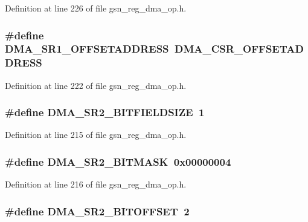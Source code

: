 Definition at line 226 of file gsn\_\-reg\_\-dma\_\-op.h.

\hypertarget{a00547_ada0e235423bd4db7ed48117ea4e5351a}{
\subsubsection[{DMA\_\-SR1\_\-OFFSETADDRESS}]{\setlength{\rightskip}{0pt plus 5cm}\#define DMA\_\-SR1\_\-OFFSETADDRESS~DMA\_\-CSR\_\-OFFSETADDRESS}}
\label{a00547_ada0e235423bd4db7ed48117ea4e5351a}


Definition at line 222 of file gsn\_\-reg\_\-dma\_\-op.h.

\hypertarget{a00547_ad366e18f388c97c7fa1c05106ed5b94f}{
\subsubsection[{DMA\_\-SR2\_\-BITFIELDSIZE}]{\setlength{\rightskip}{0pt plus 5cm}\#define DMA\_\-SR2\_\-BITFIELDSIZE~1}}
\label{a00547_ad366e18f388c97c7fa1c05106ed5b94f}


Definition at line 215 of file gsn\_\-reg\_\-dma\_\-op.h.

\hypertarget{a00547_aaf7ab40ea8ae2ad0865247654987b347}{
\subsubsection[{DMA\_\-SR2\_\-BITMASK}]{\setlength{\rightskip}{0pt plus 5cm}\#define DMA\_\-SR2\_\-BITMASK~0x00000004}}
\label{a00547_aaf7ab40ea8ae2ad0865247654987b347}


Definition at line 216 of file gsn\_\-reg\_\-dma\_\-op.h.

\hypertarget{a00547_a04709a58304f2d8e896081ed6cf6815c}{
\subsubsection[{DMA\_\-SR2\_\-BITOFFSET}]{\setlength{\rightskip}{0pt plus 5cm}\#define DMA\_\-SR2\_\-BITOFFSET~2}}
\label{a00547_a04709a58304f2d8e896081ed6cf6815c}


